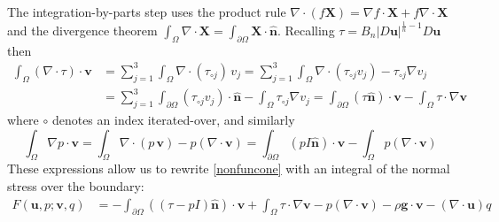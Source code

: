 \documentclass[letterpaper,final,12pt,reqno]{amsart}
\newcommand{\grad}{\nabla}
\newcommand{\hbn}{\hat{\mathbf{n}}}
\newcommand{\bu}{\mathbf{u}}
\newcommand{\bv}{\mathbf{v}}
\newcommand{\bX}{\mathbf{X}}
\begin{document}
The integration-by-parts step uses the product rule $\nabla \cdot(f\bX) = \grad f\cdot \bX + f \nabla \cdot \bX$ and the divergence theorem $\int_\Omega \nabla \cdot \bX = \int_{\partial \Omega} \bX \cdot \hbn$.  Recalling $\tau = B_n |D\bu|^{\frac{1}{n} - 1} D\bu$ then
\begin{align*}
\int_\Omega \left(\nabla \cdot \tau\right)\cdot \bv &= \sum_{j=1}^3 \int_\Omega \nabla \cdot (\tau_{\circ j})\, v_j = \sum_{j=1}^3 \int_\Omega \nabla \cdot (\tau_{\circ j} v_j) - \tau_{\circ j} \nabla v_j \\
  &= \sum_{j=1}^3 \int_{\partial \Omega} (\tau_{\circ j} v_j) \cdot \hbn - \int_\Omega \tau_{\circ j} \nabla v_j = \int_{\partial \Omega} (\tau \hbn)\cdot \bv - \int_\Omega \tau \cdot \nabla \bv
\end{align*}
where $\circ$ denotes an index iterated-over, and similarly
    $$\int_\Omega \nabla p \cdot \bv = \int_\Omega \nabla\cdot (p\,\bv) - p (\nabla \cdot \bv) = \int_{\partial \Omega} (p I\hbn)\cdot \bv - \int_\Omega p (\nabla \cdot \bv)$$
These expressions allow us to rewrite \eqref{nonfuncone} with an integral of the normal stress over the boundary:
\begin{align}
F(\bu,p;\bv,q) &= -\int_{\partial\Omega} ((\tau-pI) \hbn)\cdot \bv + \int_\Omega \tau \cdot \nabla \bv - p (\nabla \cdot \bv) - \rho \mathbf{g} \cdot \bv - \left(\nabla \cdot \bu\right) q \label{nonfunctwo}
\end{align}





\footnotesize

\bigskip
\end{document}

